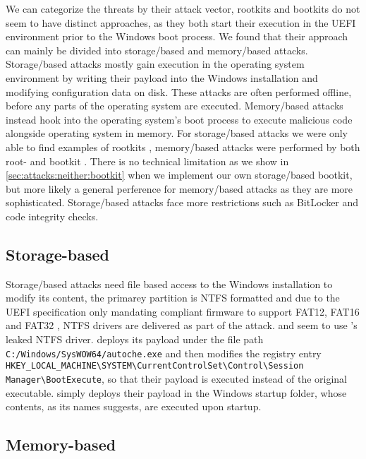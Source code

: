 We can categorize the threats by their attack vector, rootkits and bootkits do not seem to have distinct approaches, as they both start their execution in the \ac{UEFI} environment prior to the Windows boot process.
We found that their approach can mainly be divided into storage\-/based and memory\-/based attacks.
Storage\-/based attacks mostly gain execution in the operating system  environment by writing their payload into the Windows installation and modifying configuration data on disk. These attacks are often performed offline, before any parts of the operating system are executed. Memory\-/based attacks instead hook into the operating system's boot process to execute malicious code alongside operating system in memory. For storage\-/based attacks we were only able to find examples of rootkits \cite{vector-edk,mosaicregressor,lojax}, memory\-/based attacks were performed by both root- and bootkit \cite{dreamboot,efiguard,especter,finspy,moonbounce,cosmicstrand}.
There is no technical limitation as we show in \autoref{sec:attacks:neither:bootkit} when we implement our own storage\-/based bootkit, but more likely a general perference for memory\-/based attacks as they are more sophisticated. Storage\-/based attacks face more restrictions such as BitLocker and code integrity checks.

\subsection{Storage-based}

Storage\-/based attacks need file based access to the Windows installation to modify its content, the primarey partition is \ac{NTFS} formatted and due to the \ac{UEFI} specification only mandating compliant firmware to support \ac{FAT}12, \ac{FAT}16 and \ac{FAT}32 \cite[13.3.1.1]{uefi-spec}, \ac{NTFS} drivers are delivered as part of the attack. \cite{mosaicregressor} and \cite{lojax} seem to use \cite{vector-edk}'s leaked \ac{NTFS} driver. \cite{lojax} deploys its payload under the file path \lstinline{C:/Windows/SysWOW64/autoche.exe} and then modifies the registry entry \lstinline{HKEY_LOCAL_MACHINE\SYSTEM\CurrentControlSet\Control\Session Manager\BootExecute}, so that their payload is executed instead of the original executable. \cite{mosaicregressor} simply deploys their payload in the Windows startup folder, whose contents, as its names suggests, are executed upon startup.

\subsection{Memory-based}

